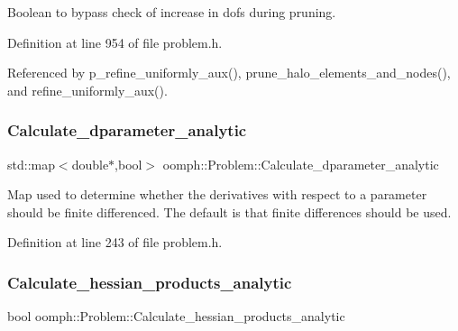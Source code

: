 Boolean to bypass check of increase in dofs during pruning. 



Definition at line 954 of file problem.\+h.



Referenced by p\+\_\+refine\+\_\+uniformly\+\_\+aux(), prune\+\_\+halo\+\_\+elements\+\_\+and\+\_\+nodes(), and refine\+\_\+uniformly\+\_\+aux().

\mbox{\label{classoomph_1_1Problem_a3f2b7c1d8e0086a316b7ec0cc2a63327}} 
\subsubsection{\texorpdfstring{Calculate\+\_\+dparameter\+\_\+analytic}{Calculate\_dparameter\_analytic}}
{\footnotesize\ttfamily std\+::map$<$double$\ast$,bool$>$ oomph\+::\+Problem\+::\+Calculate\+\_\+dparameter\+\_\+analytic\hspace{0.3cm}{\ttfamily [protected]}}



Map used to determine whether the derivatives with respect to a parameter should be finite differenced. The default is that finite differences should be used. 



Definition at line 243 of file problem.\+h.

\mbox{\label{classoomph_1_1Problem_ac353f1325a3b411b30fbc19314cc18ce}} 
\subsubsection{\texorpdfstring{Calculate\+\_\+hessian\+\_\+products\+\_\+analytic}{Calculate\_hessian\_products\_analytic}}
{\footnotesize\ttfamily bool oomph\+::\+Problem\+::\+Calculate\+\_\+hessian\+\_\+products\+\_\+analytic\hspace{0.3cm}{\ttfamily [protected]}}



